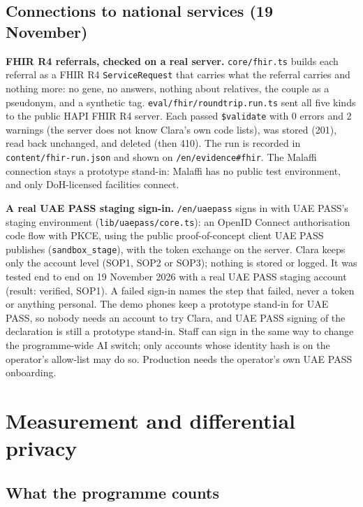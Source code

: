 \documentclass[10.5pt,a4paper]{article}
\newcommand{\chapterbreak}{}
\let\oldsection\section
\renewcommand{\section}{\chapterbreak\oldsection}
\newcommand{\code}[1]{\texttt{\small #1}}
\newcommand{\file}[1]{\leavevmode\textcolor{muted}{\texttt{\small #1}}}
\begin{document}
\subsection{Connections to national services (19 November)}\label{sec:connect}

\textbf{FHIR R4 referrals, checked on a real server.} \file{core/fhir.ts} builds each referral as a FHIR R4
\code{ServiceRequest} that carries what the referral carries and nothing more: no gene, no answers, nothing about
relatives, the couple as a pseudonym, and a synthetic tag. \file{eval/fhir/roundtrip.run.ts} sent all five kinds to the
public HAPI FHIR R4 server. Each passed \code{\$validate} with 0 errors and 2 warnings (the server does not know Clara's
own code lists), was stored (201), read back unchanged, and deleted (then 410). The run is recorded in
\file{content/fhir-run.json} and shown on \code{/en/evidence\#fhir}. The Malaffi connection stays a prototype stand-in: Malaffi has no public
test environment, and only DoH-licensed facilities connect.

\textbf{A real UAE PASS staging sign-in.} \code{/en/uaepass} signs in with UAE PASS's staging environment
(\file{lib/uaepass/core.ts}): an OpenID Connect authorisation code flow with PKCE, using the public proof-of-concept
client UAE PASS publishes (\code{sandbox\_stage}), with the token exchange on the server. Clara keeps only the account
level (SOP1, SOP2 or SOP3); nothing is stored or logged. It was tested end to end on 19 November 2026 with a real UAE
PASS staging account (result: verified, SOP1). A failed sign-in names the step that failed, never a token or anything
personal. The demo phones keep a prototype stand-in for UAE PASS, so nobody needs an account to try Clara, and UAE PASS signing
of the declaration is still a prototype stand-in. Staff can sign in the same way to change the programme-wide AI switch;
only accounts whose identity hash is on the operator's allow-list may do so. Production needs the operator's own UAE PASS onboarding.

\section{Measurement and differential privacy}

\subsection{What the programme counts}
\end{document}

